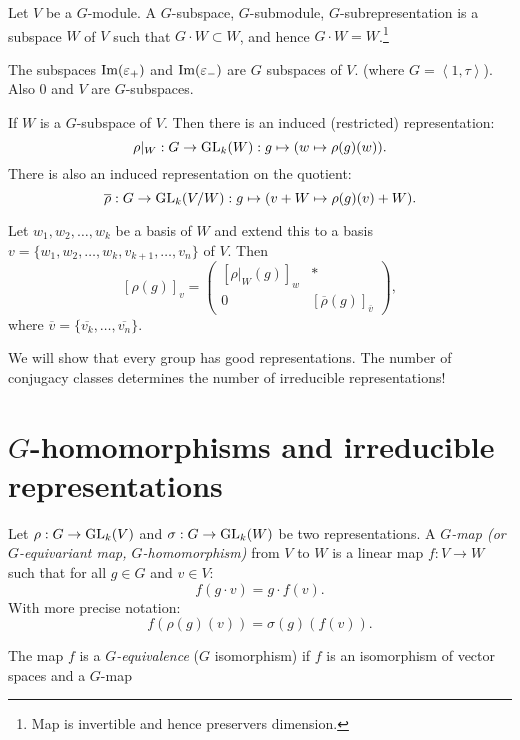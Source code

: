 \begin{definition}[$G$-subspace]
    Let $V$ be a $G$-module.
    A $G$-subspace, $G$-submodule, $G$-subrepresentation  is a subspace $W$ of $V$ such that $G\cdot W \subset W$, and hence $G \cdot W = W$.\footnote{Map is invertible and hence preservers dimension.}
\end{definition}

\begin{eg}
    The subspaces $\operatorname{Im}(\varepsilon_+)$ and  $\operatorname{Im}(\varepsilon_-)$ are $G$ subspaces of $V$. (where $G = \left<1, \tau \right>$).
    Also $0$ and $V$ are $G$-subspaces.
\end{eg}

If $W$ is a $G$-subspace of $V$.
Then there is an induced (restricted) representation:
\[
    \rho|_W : G \to \operatorname{GL}_k(W) : g \mapsto (w \mapsto \rho(g)(w))
.\] 
There is also an induced representation on the quotient:
\[
    \overline{\rho}: G \to  \operatorname{GL}_k(V / W) : g \mapsto (v + W \mapsto  \rho(g)(v) + W)
.\]


\begin{remark}
    Let $ w_1, w_2, \ldots, w_k$ be a basis of $W$ and extend this to a basis $v = \{w_1, w_2, \ldots, w_k, v_{k+1}, \ldots, v_n\}$ of $V$.
    Then
    \[
        [\rho(g)]_v = 
        \begin{pmatrix}
            [\rho|_W(g)]_w & * \\
            0 & [\overline{\rho}(g)]_{\overline{v}}
        \end{pmatrix}
    ,\] 
    where $\overline{v} = \{\overline{v_k}, \ldots, \overline{v_n}\}$.
\end{remark}

\begin{remark}
    We will show that every group has good representations.
    The number of conjugacy classes determines the number of irreducible representations!
\end{remark}

\section{$G$-homomorphisms and irreducible representations}


\begin{definition}[$G$-homomorphisms]
    Let $\rho: G \to  \operatorname{GL}_k(V)$ and $\sigma: G \to  \operatorname{GL}_k(W)$ be two representations.
    A \emph{$G$-map (or $G$-equivariant map, $G$-homomorphism)} from $V$ to $W$ is a linear map $f: V \to  W$ such that  for all $g \in G$ and $v \in V$:
    \[
        f(g\cdot v) = g\cdot f(v)
    .\] 
    With more precise notation:
    \[
        f(\rho(g)(v)) = \sigma(g)(f(v))
    .\] 

    The map $f$ is a \emph{$G$-equivalence} ($G$ isomorphism) if $f$ is an isomorphism of vector spaces and a  $G$-map

\end{definition}

